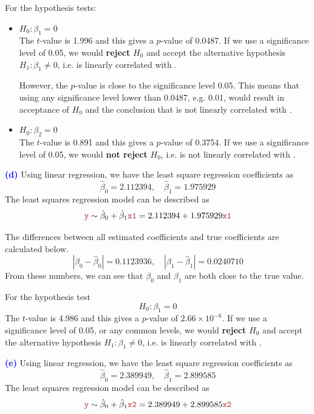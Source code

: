 \documentclass[a4paper,12pt]{article}
\newcommand{\qnum}[1]{\noindent\textcolor{blue}{\textbf{(#1)}}}
\begin{document}
For the hypothesis tests:
\begin{itemize}
    \item $H_0: \beta_1 = 0$\\
    The $t$-value is 1.996 and this gives a $p$-value of 0.0487. If we use a significance level of 0.05, we would \textbf{reject} $H_0$ and accept the alternative hypothesis $H_1: \beta_1 \ne 0$, i.e. \yr is linearly correlated with \xar. 
    
    However, the $p$-value is close to the significance level 0.05. This means that using any significance level lower than 0.0487, e.g. 0.01, would result in acceptance of $H_0$ and the conclusion that \yr is not linearly correlated with \xar.
    
    \item $H_0: \beta_2 = 0$\\
    The $t$-value is 0.891 and this gives a $p$-value of 0.3754. If we use a significance level of 0.05, we would \textbf{not reject} $H_0$, i.e. \yr is not linearly correlated with \xbr.
\end{itemize}
\bigskip





\qnum{d}
Using linear regression, we have the least square regression coefficients as 
\[
    \hat\beta_0 = 2.112394 ,\quad 
    \hat\beta_1 = 1.975929 
\]
The least squares regression model can be described as 
\[
    \yr \sim\hat\beta_0 + \hat\beta_1\xar 
    = 2.112394 + 
    1.975929\xar 
\]

The differences between all estimated coefficients and true coefficients are calculated below.
\[
    |\beta_0 - \hat\beta_0| = 0.1123936,\quad 
    |\beta_1 - \hat\beta_1| = 0.0240710
\]
From these numbers, we can see that $\beta_0$ and $\beta_1$ are both close to the true value.
\bigskip

For the hypothesis test
\[
    H_0: \beta_1 = 0
\]
The $t$-value is 4.986 and this gives a $p$-value of $2.66\times 10^{-6}$. If we use a significance level of 0.05, or any common levels, we would \textbf{reject} $H_0$ and accept the alternative hypothesis $H_1: \beta_1 \ne 0$, i.e. \yr is linearly correlated with \xar. 
\bigskip
    
    

\qnum{e}
Using linear regression, we have the least square regression coefficients as 
\[
    \hat\beta_0 = 2.389949 ,\quad 
    \hat\beta_1 = 2.899585 
\]
The least squares regression model can be described as 
\[
    \yr \sim\hat\beta_0 + \hat\beta_1\xbr 
    = 2.389949 + 
    2.899585\xbr 
\]
\end{document}
